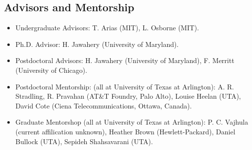 \subsection*{Advisors and Mentorship}
\begin{itemize}
\item Undergraduate Advisors: T. Arias (MIT), L. Osborne (MIT).
\item Ph.D. Advisor: H. Jawahery (University of Maryland).
\item Postdoctoral Advisors:  H. Jawahery (University of Maryland), F. Merritt (University of Chicago).
\item Postdoctoral Mentorship:  (all at University of Texas at Arlington): A. R. Stradling, R. Pravahan (AT\&T Foundry, Palo Alto), Louise Heelan (UTA), David Cote (Ciena Telecommunications, Ottawa, Canada).
\item Graduate Mentorshop (all at University of Texas at Arlington): P. C. Vajhula (current affilication unknown), Heather Brown (Hewlett-Packard),  Daniel Bullock (UTA),  Sepideh Shahsavarani (UTA).
\end{itemize}

%
